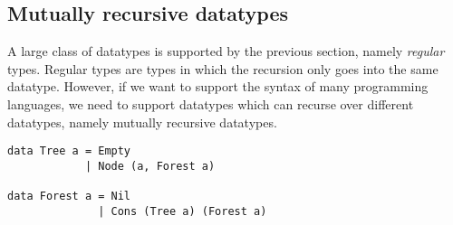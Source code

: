 \subsection{Mutually recursive datatypes}
A large class of datatypes is supported by the previous section, namely \textit{regular} types. Regular types are types in which the recursion only goes into the same datatype. However, if we want to support the syntax of many programming languages, we need to support datatypes which can recurse over different datatypes, namely mutually recursive datatypes.

\begin{verbatim}
data Tree a = Empty 
            | Node (a, Forest a)

data Forest a = Nil
              | Cons (Tree a) (Forest a)
\end{verbatim}

